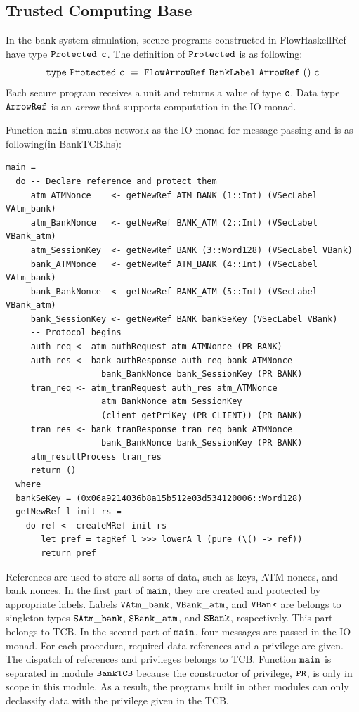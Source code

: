 \documentclass[a4paper]{report}
\newcommand{\co}[1]{$\cod{#1}$}
\begin{document}
\subsection{Trusted Computing Base}
\label{chap6:banksystem:tcb}
In the bank system simulation, secure programs constructed in FlowHaskellRef have type \co{Protected} \co{c}.
The definition of \co{Protected} is as following:
\[
\mathtt{type}~\mathtt{Protected}~\mathtt{c}~=~\mathtt{FlowArrowRef}~\mathtt{BankLabel}~\mathtt{ArrowRef}~()~\mathtt{c}
\]
Each secure program receives a unit and returns a value of type \co{c}. Data type \co{ArrowRef} is an {\em arrow}
that supports computation in the IO monad.

Function \co{main} simulates network as the IO monad for message passing and is as following(in BankTCB.hs):
\begin{Verbatim}[fontsize=\footnotesize]
main =
  do -- Declare reference and protect them
     atm_ATMNonce    <- getNewRef ATM_BANK (1::Int) (VSecLabel VAtm_bank)
     atm_BankNonce   <- getNewRef BANK_ATM (2::Int) (VSecLabel VBank_atm)
     atm_SessionKey  <- getNewRef BANK (3::Word128) (VSecLabel VBank)
     bank_ATMNonce   <- getNewRef ATM_BANK (4::Int) (VSecLabel VAtm_bank)
     bank_BankNonce  <- getNewRef BANK_ATM (5::Int) (VSecLabel VBank_atm)
     bank_SessionKey <- getNewRef BANK bankSeKey (VSecLabel VBank) 
     -- Protocol begins
     auth_req <- atm_authRequest atm_ATMNonce (PR BANK)
     auth_res <- bank_authResponse auth_req bank_ATMNonce 
                   bank_BankNonce bank_SessionKey (PR BANK)
     tran_req <- atm_tranRequest auth_res atm_ATMNonce 
                   atm_BankNonce atm_SessionKey
                   (client_getPriKey (PR CLIENT)) (PR BANK)
     tran_res <- bank_tranResponse tran_req bank_ATMNonce 
                   bank_BankNonce bank_SessionKey (PR BANK)
     atm_resultProcess tran_res
     return ()
  where
  bankSeKey = (0x06a9214036b8a15b512e03d534120006::Word128)
  getNewRef l init rs =
    do ref <- createMRef init rs
       let pref = tagRef l >>> lowerA l (pure (\() -> ref))
       return pref
\end{Verbatim}
References are used to store all sorts of data, such as keys, ATM nonces, and bank nonces. In the first
part of \co{main}, they are created and protected by appropriate labels. 
Labels \co{VAtm\_bank}, \co{VBank\_atm}, and \co{VBank} are belongs to singleton types
\co{SAtm\_bank}, \co{SBank\_atm}, and \co{SBank}, respectively.
This part belongs to TCB. 
In the second part of \co{main},
four messages are passed in the IO monad. For each procedure, required data references and a privilege are given.
The dispatch of references and privileges belongs to TCB. Function \co{main} is separated in module \co{BankTCB}
because the constructor of privilege, \co{PR}, is only in scope in this module. 
As a result, the programs built in other modules can only declassify data with the privilege
given in the TCB.
\end{document}
